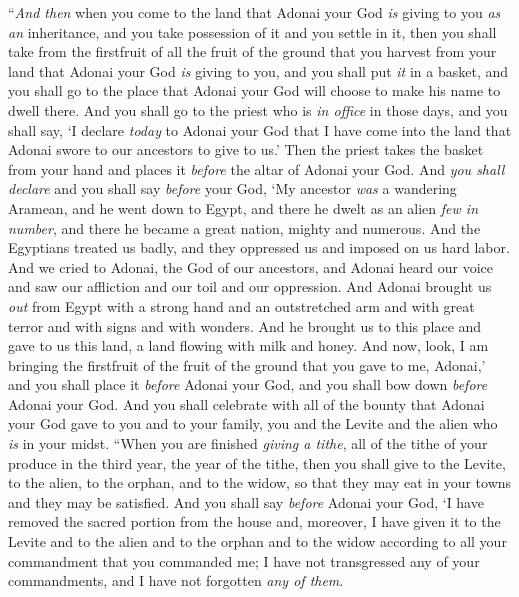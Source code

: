 \begin{biblechapter} %
\verse “\textit{And then} when you come to the land that Adonai your God \textit{is} giving to you \textit{as an} inheritance, and you take possession of it and you settle in it,
\verse then you shall take from the firstfruit of all the fruit of the ground that you harvest from your land that Adonai your God \textit{is} giving to you, and you shall put \textit{it} in a basket, and you shall go to the place that Adonai your God will choose to make his name to dwell there.
\verse And you shall go to the priest who is \textit{in office} in those days, and you shall say, ‘I declare \textit{today} to Adonai your God that I have come into the land that Adonai swore to our ancestors to give to us.’
\verse Then the priest takes the basket from your hand and places it \textit{before} the altar of Adonai your God.
\verse And \textit{you shall declare} and you shall say \textit{before} your God, ‘My ancestor \textit{was} a wandering Aramean, and he went down to Egypt, and there he dwelt as an alien \textit{few in number}, and there he became a great nation, mighty and numerous.
\verse And the Egyptians treated us badly, and they oppressed us and imposed on us hard labor.
\verse And we cried to Adonai, the God of our ancestors, and Adonai heard our voice and saw our affliction and our toil and our oppression.
\verse And Adonai brought us \textit{out} from Egypt with a strong hand and an outstretched arm and with great terror and with signs and with wonders.
\verse And he brought us to this place and gave to us this land, a land flowing with milk and honey.
\verse And now, look, I am bringing the firstfruit of the fruit of the ground that you gave to me, Adonai,’ and you shall place it \textit{before} Adonai your God, and you shall bow down \textit{before} Adonai your God.
\verse And you shall celebrate with all of the bounty that Adonai your God gave to you and to your family, you and the Levite and the alien who \textit{is} in your midst.
\verse “When you are finished \textit{giving a tithe}, all of the tithe of your produce in the third year, the year of the tithe, then you shall give to the Levite, to the alien, to the orphan, and to the widow, so that they may eat in your towns and they may be satisfied.
\verse And you shall say \textit{before} Adonai your God, ‘I have removed the sacred portion from the house and, moreover, I have given it to the Levite and to the alien and to the orphan and to the widow according to all your commandment that you commanded me; I have not transgressed any of your commandments, and I have not forgotten \textit{any of them}.

\end{biblechapter}
